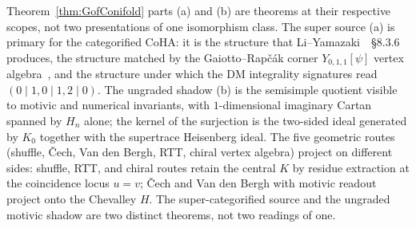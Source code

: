 \begin{remark}
\label{rem:super-vs-even-cy-to-chiral}
Theorem~\ref{thm:GofConifold} parts (a) and (b) are theorems at their
respective scopes, not two presentations of one isomorphism class. The
super source (a) is primary for the categorified CoHA: it is the
structure that Li--Yamazaki~\cite{LiYamazaki2020}~\S$8.3.6$ produces,
the structure matched by the Gaiotto--Rap\v{c}\'ak corner
$Y_{0, 1, 1}[\psi]$ vertex algebra~\cite{GaiottoRapcak2019}, and the
structure under which the DM integrality signatures read
$(0 \mid 1, 0 \mid 1, 2 \mid 0)$. The ungraded shadow (b) is the
semisimple quotient visible to motivic and numerical invariants, with
$1$-dimensional imaginary Cartan spanned by $H_n$ alone; the kernel of
the surjection is the two-sided ideal generated by $K_0$ together with
the supertrace Heisenberg ideal. The five geometric routes (shuffle,
\v{C}ech, Van den Bergh, RTT, chiral vertex algebra) project on
different sides: shuffle, RTT, and chiral routes retain the central
$K$ by residue extraction at the coincidence locus $u = v$; \v{C}ech
and Van den Bergh with motivic readout project onto the Chevalley $H$.
The super-categorified source and the ungraded motivic shadow are two
distinct theorems, not two readings of one.
\end{remark}

